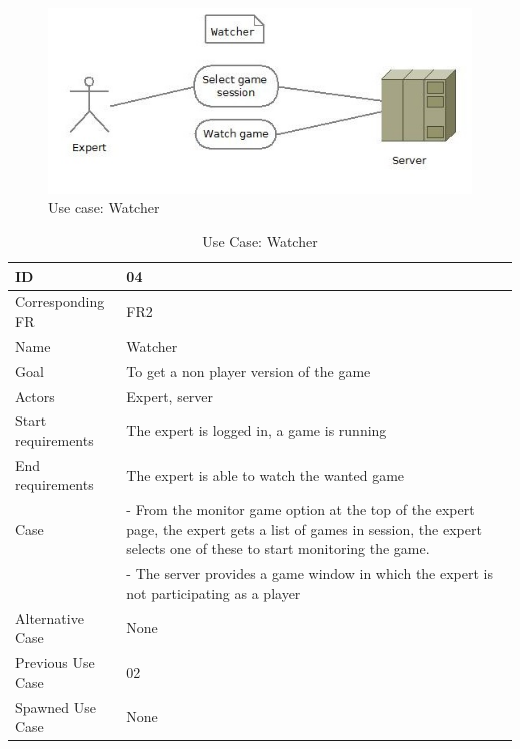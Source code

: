 \begin{figure}[H]
  \centering
    \includegraphics[width=1.0\textwidth]{img/watcher.jpg}
  \caption{Use case: Watcher} 
  \label{fig:watcher}
\end{figure}


\begin{table}[H]
\begin{tabular}{|l|p{14cm}|}
\hline
	\textbf{ID} & \textbf{04}\\ \hline
	Corresponding FR & FR2\\ \hline
	Name & Watcher\\ \hline
	Goal & To get a non player version of the game\\ \hline
	Actors & Expert, server\\ \hline
	Start requirements & The expert is logged in, a game is running \\ \hline
	End requirements & The expert is able to watch the wanted game\\ \hline
	Case & - From the monitor game option at the top of the expert page, the expert gets a list of games in session, the expert selects one of these to start monitoring the game.\\
		 & - The server provides a game window in which the expert is not participating as a player\\ \hline
	Alternative Case & None \\ \hline
	Previous Use Case & 02\\ \hline
	Spawned Use Case & None\\ \hline
\end{tabular}
\caption{Use Case: Watcher}
\label{fig:usecase04table}
\end{table}


